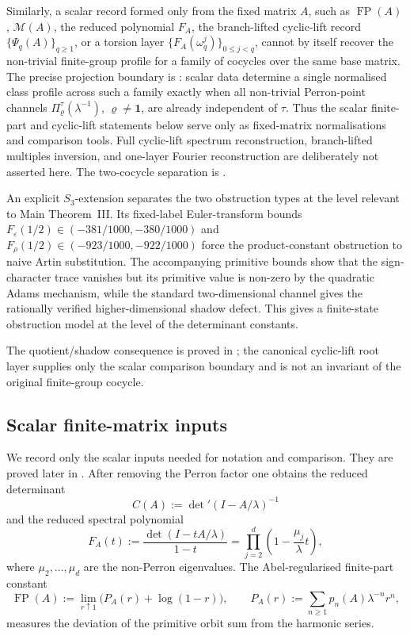 \documentclass[11pt,a4paper]{amsart}
\theoremstyle{plain}
\theoremstyle{definition}
\theoremstyle{remark}
\DeclareMathOperator{\FP}{FP}
\begin{document}
Similarly, a scalar record formed only from the fixed matrix \(A\), such
as \(\FP(A)\), \(\mathcal M(A)\), the reduced polynomial \(F_A\), the
branch-lifted cyclic-lift record \(\{\Psi_q(A)\}_{q\ge1}\), or a torsion
layer \(\{F_A(\omega_q^j)\}_{0\le j<q}\), cannot by itself recover the
non-trivial finite-group profile for a family of cocycles over the same
base matrix. The precise projection boundary is
: scalar data determine
a single normalised class profile across such a family exactly when all
non-trivial Perron-point channels
\(\Pi_\varrho^\tau(\lambda^{-1})\), \(\varrho\ne\mathbf1\), are already
independent of \(\tau\). Thus the scalar finite-part and cyclic-lift
statements below serve only as fixed-matrix normalisations and comparison
tools.  Full cyclic-lift spectrum reconstruction, branch-lifted multiples
inversion, and one-layer Fourier reconstruction are deliberately not asserted
here.  The two-cocycle separation is
.

An explicit \(S_3\)-extension separates the two obstruction types at the
level relevant to Main Theorem~III.  Its fixed-label Euler-transform
bounds
\(F_\varepsilon(1/2)\in(-381/1000,-380/1000)\) and
\(F_\rho(1/2)\in(-923/1000,-922/1000)\) force the product-constant
obstruction to naive Artin substitution.  The accompanying primitive
bounds show that the sign-character trace vanishes but its primitive
value is non-zero by the quadratic Adams mechanism, while the standard
two-dimensional channel gives the rationally verified higher-dimensional shadow
defect. This gives a finite-state obstruction model at the level of the
determinant constants.

The quotient/shadow consequence is proved in
; the canonical cyclic-lift root layer supplies only the scalar comparison boundary and is not an invariant of the original finite-group cocycle.







\subsection{Scalar finite-matrix inputs}

We record only the scalar inputs needed for notation and comparison.
They are proved later in . After removing the
Perron factor one obtains the reduced determinant
\[
  C(A):=\det\nolimits'(I-A/\lambda)^{-1}
\]
and the reduced spectral polynomial
\[
  F_A(t):=\frac{\det(I-tA/\lambda)}{1-t}
  =\prod_{j=2}^d\left(1-\frac{\mu_j}{\lambda}t\right),
\]
where \(\mu_2,\dots,\mu_d\) are the non-Perron eigenvalues. The
Abel-regularised finite-part constant
\[
  \FP(A):=\lim_{r\uparrow 1}\bigl(P_A(r)+\log(1-r)\bigr),
  \qquad
  P_A(r):=\sum_{n\ge 1}p_n(A)\lambda^{-n}r^n,
\]
measures the deviation of the primitive orbit sum from the harmonic
series.
\end{document}
